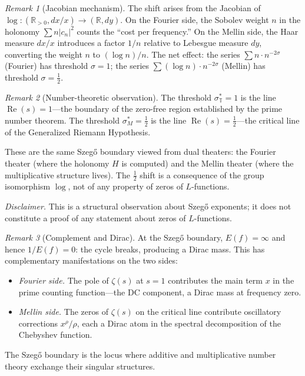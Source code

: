 \documentclass[12pt]{amsart}
\theoremstyle{definition}
\theoremstyle{remark}
\newtheorem*{remark}{Remark}
\newcommand{\R}{\mathbb{R}}
\newcommand{\Rpos}{\mathbb{R}_{>0}}
\newcommand{\bT}{\mathbb{T}}
\begin{document}
\begin{remark}[Jacobian mechanism]
The shift arises from the Jacobian of $\log : (\Rpos, dx/x) \to (\R, dy)$. On the Fourier side, the Sobolev weight $n$ in the holonomy $\sum n|c_n|^2$ counts the ``cost per frequency.'' On the Mellin side, the Haar measure $dx/x$ introduces a factor $1/n$ relative to Lebesgue measure $dy$, converting the weight $n$ to $(\log n)/n$. The net effect: the series $\sum n \cdot n^{-2\sigma}$ (Fourier) has threshold $\sigma = 1$; the series $\sum (\log n) \cdot n^{-2\sigma}$ (Mellin) has threshold $\sigma = \tfrac{1}{2}$.
\end{remark}

\begin{remark}[Number-theoretic observation]
The threshold $\sigma_{\bT}^* = 1$ is the line $\operatorname{Re}(s) = 1$---the boundary of the zero-free region established by the prime number theorem. The threshold $\sigma_M^* = \tfrac{1}{2}$ is the line $\operatorname{Re}(s) = \tfrac{1}{2}$---the critical line of the Generalized Riemann Hypothesis.

These are the same Szeg\H{o} boundary viewed from dual theaters: the Fourier theater (where the holonomy $H$ is computed) and the Mellin theater (where the multiplicative structure lives). The $\tfrac{1}{2}$ shift is a consequence of the group isomorphism $\log$, not of any property of zeros of $L$-functions.

\emph{Disclaimer.} This is a structural observation about Szeg\H{o} exponents; it does not constitute a proof of any statement about zeros of $L$-functions.
\end{remark}

\begin{remark}[Complement and Dirac]
At the Szeg\H{o} boundary, $E(f) = \infty$ and hence $1/E(f) = 0$: the cycle breaks, producing a Dirac mass. This has complementary manifestations on the two sides:
\begin{itemize}
\item \emph{Fourier side.} The pole of $\zeta(s)$ at $s = 1$ contributes the main term $x$ in the prime counting function---the DC component, a Dirac mass at frequency zero.
\item \emph{Mellin side.} The zeros of $\zeta(s)$ on the critical line contribute oscillatory corrections $x^\rho / \rho$, each a Dirac atom in the spectral decomposition of the Chebyshev function.
\end{itemize}
The Szeg\H{o} boundary is the locus where additive and multiplicative number theory exchange their singular structures.
\end{remark}
\end{document}

